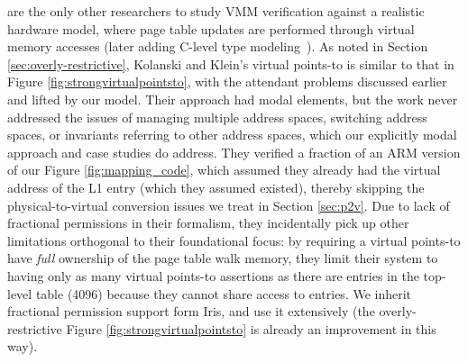 \citet{kolanski08vstte} are the only other researchers to study VMM verification against a realistic hardware
model, where page table updates are performed through virtual memory accesses (later adding C-level type modeling~\cite{kolanski09tphols}).
As noted in Section \ref{sec:overly-restrictive}, Kolanski and Klein's virtual points-to is similar to that in Figure \ref{fig:strongvirtualpointsto},
with the attendant problems discussed earlier and lifted by our model. Their approach had modal elements,
but the work never addressed the issues of managing multiple address spaces, switching address spaces, or
invariants referring to other address spaces, which our explicitly modal approach and case studies do address.
They verified a fraction of an ARM version of our Figure \ref{fig:mapping_code}, which assumed they already had the virtual address
of the L1 entry (which they assumed existed), thereby skipping the physical-to-virtual conversion issues we treat in Section \ref{sec:p2v}.
Due to lack of fractional permissions in their formalism, they incidentally pick up other limitations orthogonal to their
foundational focus: by requiring
a virtual points-to have \emph{full} ownership of the page table walk memory, they limit their system to having only as many
virtual points-to assertions as there are entries in the top-level table (4096) because they cannot share access to entries.
We inherit fractional permission support form Iris, and use it extensively (the overly-restrictive
Figure \ref{fig:strongvirtualpointsto} is already an improvement in this way).
 

